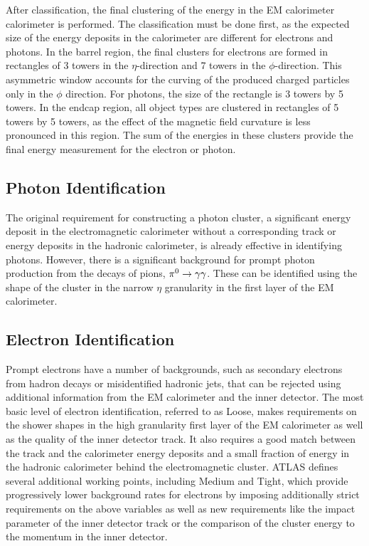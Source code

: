 After classification, the final clustering of the energy in the \ac{EM} calorimeter calorimeter is performed.
The classification must be done first, as the expected size of the energy deposits in the calorimeter are different for electrons and photons.
In the barrel region, the final clusters for electrons are formed in rectangles of 3 towers in the $\eta$-direction and 7 towers in the $\phi$-direction.
This asymmetric window accounts for the curving of the produced charged particles only in the $\phi$ direction.
For photons, the size of the rectangle is 3 towers by 5 towers.
In the endcap region, all object types are clustered in rectangles of 5 towers by 5 towers, as the effect of the magnetic field curvature is less pronounced in this region.
The sum of the energies in these clusters provide the final energy measurement for the electron or photon.

\subsection{Photon Identification}

The original requirement for constructing a photon cluster, a significant energy deposit in the electromagnetic calorimeter without a corresponding track or energy deposits in the hadronic calorimeter, is already effective in identifying photons.
However, there is a significant background for prompt photon production from the decays of pions, $\pi^0 \rightarrow \gamma\gamma$.
These can be identified using the shape of the cluster in the narrow $\eta$ granularity in the first layer of the \ac{EM} calorimeter.

\subsection{Electron Identification}

Prompt electrons have a number of backgrounds, such as secondary electrons from hadron decays or misidentified hadronic jets, that can be rejected using additional information from the \ac{EM} calorimeter and the inner detector.
The most basic level of electron identification, referred to as Loose, makes requirements on the shower shapes in the high granularity first layer of the \ac{EM} calorimeter as well as the quality of the inner detector track.
It also requires a good match between the track and the calorimeter energy deposits and a small fraction of energy in the hadronic calorimeter behind the electromagnetic cluster.
\ac{ATLAS} defines several additional working points, including Medium and Tight, which provide progressively lower background rates for electrons by imposing additionally strict requirements on the above variables as well as new requirements like the impact parameter of the inner detector track or the comparison of the cluster energy to the momentum in the inner detector.


